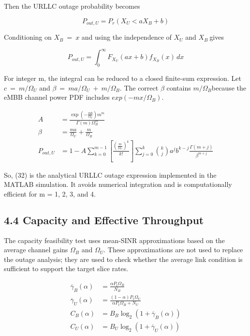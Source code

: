 \documentclass[
]{article}
\begin{document}
Then the URLLC outage probability becomes

\begin{equation}
P_{out,U} = P_{r}(X_{U} < aX_{B} + b)
\end{equation}

Conditioning on \(X_{B}\  = \ x\) and using the independence of
\(X_{U}\) and \(X_{B}\ \)gives

\begin{equation}
P_{out,U} = \int_{0}^{\infty} F_{X_{U}}(ax + b) f_{X_{B}}(x) \, dx
\end{equation}

For integer m, the integral can be reduced to a closed finite-sum
expression. Let \(c\  = \ m/\Omega_{U}\) and
\(\beta\  = \ ma/\Omega_{U}\  + \ m/\Omega_{B}\). The correct \(\beta\)
contains \(m/\Omega_{B}\)because the eMBB channel power PDF includes
\(exp( - mx/\Omega_{B})\).

\begin{align}
A &= \frac{\exp\left( -\frac{mb}{\Omega_{U}} \right) m^{m}}{\Gamma(m) \Omega_{B}^{m}} \\[1ex]
\beta &= \frac{ma}{\Omega_{U}} + \frac{m}{\Omega_{B}} \\[1ex]
P_{out,U} &= 1 - A \sum_{k=0}^{m-1} \left[ \frac{\left( \frac{m}{\Omega_{U}} \right)^{k}}{k!} \right] \sum_{j=0}^{k} \binom{k}{j} a^{j} b^{k-j} \frac{\Gamma(m+j)}{\beta^{m+j}}
\end{align}

So, (32) is the analytical URLLC outage expression implemented in
the MATLAB simulation. It avoids numerical integration and is
computationally efficient for m = 1, 2, 3, and 4.

\subsection{4.4 Capacity and Effective
Throughput}\label{capacity-and-effective-throughput}

The capacity feasibility test uses mean-SINR approximations based on the
average channel gains \(\Omega_{B}\) and \(\Omega_{U}\). These
approximations are not used to replace the outage analysis; they are
used to check whether the average link condition is sufficient to
support the target slice rates.

\begin{align}
\overline{\gamma}_{B}(\alpha) &= \frac{\alpha P_{t} \Omega_{B}}{N_{B}} \\[1ex]
\overline{\gamma}_{U}(\alpha) &= \frac{(1 - \alpha)P_{t} \Omega_{U}}{\alpha P_{t} \Omega_{B} + N_{U}} \\[1ex]
C_{B}(\alpha) &= B_{B} \log_{2}(1 + \overline{\gamma}_{B}(\alpha)) \\[1ex]
C_{U}(\alpha) &= B_{U} \log_{2}(1 + \overline{\gamma}_{U}(\alpha))
\end{align}
\end{document}
